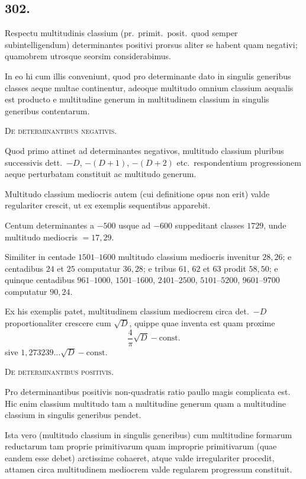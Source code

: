 \documentclass[12pt,a4paper]{article}
\theoremstyle{plain}
\theoremstyle{definition}
\theoremstyle{remark}
\begin{document}

\subsection*{302.}

Respectu multitudinis classium (pr.\ primit.\ posit.\ quod semper subintelligendum)
determinantes positivi prorsus aliter se habent quam negativi; quamobrem utrosque
seorsim considerabimus.

In eo hi cum illis conveniunt, quod pro determinante dato in singulis generibus
classes aeque multae continentur, adeoque multitudo omnium classium aequalis est
producto e multitudine generum in multitudinem classium in singulis generibus
contentarum.

\textsc{De determinantibus negativis.}

Quod primo attinet ad determinantes negativos, multitudo classium pluribus
successivis dett.\ $-D$, $-(D+1)$, $-(D+2)$ etc.\ respondentium progressionem
aeque perturbatam constituit ac multitudo generum.

Multitudo classium mediocris autem (cui definitione opus non erit) valde
regulariter crescit, ut ex exemplis sequentibus apparebit.

Centum determinantes a $-500$ usque ad $-600$ suppeditant classes $1729$,
unde multitudo mediocris $= 17{,}29$.

Similiter in centade $1501$--$1600$ multitudo classium mediocris invenitur
$28{,}26$; e centadibus $24$ et $25$ computatur $36{,}28$; e tribus $61$, $62$ et $63$
prodit $58{,}50$; e quinque centadibus $961$--$1000$, $1501$--$1600$, $2401$--$2500$,
$5101$--$5200$, $9601$--$9700$ computatur $90{,}24$.

Ex his exemplis patet, multitudinem classium mediocrem circa det.\ $-D$
proportionaliter crescere cum $\sqrt{D}$, quippe quae inventa est quam proxime
\[
\frac{4}{\pi}\sqrt{D} - \text{const.}
\]
sive $1{,}273239\ldots \sqrt{D} - \text{const.}$

\textsc{De determinantibus positivis.}

Pro determinantibus positivis non-quadratis ratio paullo magis complicata est.
Hic enim classium multitudo tam a multitudine generum quam a multitudine
classium in singulis generibus pendet.

Ista vero (multitudo classium in singulis generibus) cum multitudine formarum
reductarum tam proprie primitivarum quam improprie primitivarum (quae eandem
esse debet) arctissime cohaeret, atque valde irregulariter procedit, attamen circa
multitudinem mediocrem valde regularem progressum constituit.
\end{document}
